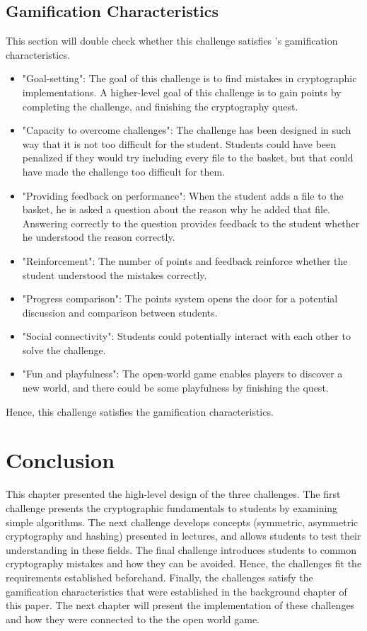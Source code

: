 \documentclass{l4proj}
\begin{document}
\subsection{Gamification Characteristics}

This section will double check whether this challenge satisfies \citet{cugelman_gamification:_2013}'s
gamification characteristics.
\begin{itemize}
    \item "Goal-setting": The goal of this challenge is to find mistakes in cryptographic implementations. 
    A higher-level goal of this challenge is to gain points by completing the challenge, 
    and finishing the cryptography quest.
    \item "Capacity to overcome challenges": The challenge has been designed in such way 
    that it is not too difficult for the student. 
    Students could have been penalized if they would try including every file to the basket, but that
    could have made the challenge too difficult for them.
    \item "Providing feedback on performance": When the student adds a file to the basket, he is asked
    a question about the reason why he added that file. Answering correctly to the question provides 
    feedback to the student whether he understood the reason correctly.
    \item "Reinforcement": The number of points and feedback reinforce whether the student understood the mistakes correctly.
    \item "Progress comparison": The points system opens the door for a potential discussion and comparison between students.
    \item "Social connectivity": Students could potentially interact with each other to solve the challenge.
    \item "Fun and playfulness": The open-world game enables players to discover a new world, 
    and there could be some playfulness by finishing the quest.
\end{itemize}
Hence, this challenge satisfies the gamification characteristics.

\section{Conclusion}

This chapter presented the high-level design of the three challenges.
The first challenge presents the cryptographic fundamentals to students by examining simple algorithms.
The next challenge develops concepts (symmetric, asymmetric cryptography and hashing) presented in lectures,
and allows students to test their understanding in these fields.
The final challenge introduces students to common cryptography mistakes and how they can be avoided.
Hence, the challenges fit the requirements established beforehand.
Finally, the challenges satisfy the gamification characteristics that were established in the background chapter of this paper.
The next chapter will present the implementation of these challenges 
and how they were connected to the the open world game.
\end{document}
